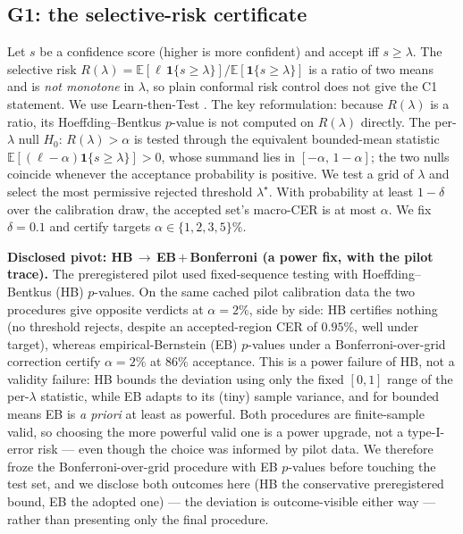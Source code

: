 \documentclass[11pt]{article}
\begin{document}
\subsection{G1: the selective-risk certificate}\label{sec:g1}

Let $s$ be a confidence score (higher is more confident) and accept iff $s\ge\lambda$.
The selective risk
$R(\lambda) = \mathbb{E}[\ell\,\mathbf{1}\{s\ge\lambda\}] / \mathbb{E}[\mathbf{1}\{s\ge\lambda\}]$
is a ratio of two means and is \emph{not monotone} in $\lambda$, so plain conformal
risk control does not give the C1 statement. We use Learn-then-Test
\citep{angelopoulos2021ltt}. The key reformulation: because $R(\lambda)$ is a ratio,
its Hoeffding--Bentkus $p$-value is not computed on $R(\lambda)$ directly. The
per-$\lambda$ null $H_0\!:\,R(\lambda)>\alpha$ is tested through the equivalent
bounded-mean statistic $\mathbb{E}[(\ell-\alpha)\mathbf{1}\{s\ge\lambda\}]>0$, whose
summand lies in $[-\alpha,\,1-\alpha]$; the two nulls coincide whenever the
acceptance probability is positive. We test a grid of $\lambda$ and select the most
permissive rejected threshold $\lambda^\star$. With probability at least $1-\delta$
over the calibration draw, the accepted set's macro-CER is at most $\alpha$. We fix
$\delta=0.1$ and certify targets $\alpha\in\{1,2,3,5\}\%$.

\textbf{Disclosed pivot: HB\,$\to$\,EB\,$+$\,Bonferroni (a power fix, with the pilot
trace).} The preregistered pilot used fixed-sequence testing with Hoeffding--Bentkus (HB)
$p$-values. On the same cached pilot calibration data the two procedures give
opposite verdicts at $\alpha=2\%$, side by side: HB certifies nothing (no
threshold rejects, despite an accepted-region CER of $0.95\%$, well under target), whereas
empirical-Bernstein (EB) $p$-values \citep{maurer2009empirical} under a Bonferroni-over-grid
correction certify $\alpha=2\%$ at $86\%$ acceptance. This is a power failure of HB, not a
validity failure: HB bounds the deviation using only the fixed $[0,1]$ range of the
per-$\lambda$ statistic, while EB adapts to its (tiny) sample variance, and for bounded means
EB is \emph{a priori} at least as powerful. Both procedures are finite-sample valid, so
choosing the more powerful valid one is a power upgrade, not a type-I-error risk --- even
though the choice was informed by pilot data. We therefore froze the Bonferroni-over-grid
procedure with EB $p$-values before touching the test set, and we disclose both
outcomes here (HB the conservative preregistered bound, EB the adopted one) --- the deviation
is outcome-visible either way --- rather than presenting only the final procedure.
\end{document}
